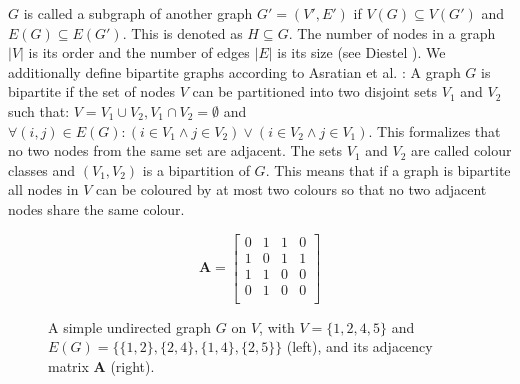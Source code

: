 $G$ is called a subgraph of another graph $G'=(V',E')$ if $V(G) \subseteq V(G')$ and $E(G) \subseteq E(G')$. This is denoted as $H \subseteq G$. The number of nodes in a graph $|V|$ is its order and the number of edges $|E|$ is its size (see Diestel \cite{Diestel2017}).
We additionally define bipartite graphs according to Asratian et al. \cite{asratian1998}: A graph $G$ is bipartite if the set of nodes $V$ can be partitioned into two disjoint sets $V_1$ and $V_2$ such that: $V = V_1 \cup V_2, V_1 \cap V_2 = \emptyset$ and $\forall (i,j) \in E(G): (i \in V_1 \land j \in V_2) \lor (i \in V_2 \land j \in V_1)$. This formalizes that no two nodes from the same set are adjacent. The sets $V_1$ and $V_2$ are called colour classes and $(V_1, V_2)$ is a bipartition of $G$. This means that if a graph is bipartite all nodes in $V$ can be coloured by at most two colours so that no two adjacent nodes share the same colour.\\
\begin{figure}[h]
    \centering
    \begin{minipage}{0.5\textwidth}
        \centering
    \end{minipage}%
    \begin{minipage}{0.45\textwidth}
        \vspace*{0.1cm} %
        \[
        \mathbf{A} = \begin{bmatrix}
            0 & 1 & 1 & 0 \\
            1 & 0 & 1 & 1 \\
            1 & 1 & 0 & 0 \\
            0 & 1 & 0 & 0 \\
        \end{bmatrix}
        \]
    \end{minipage}
    \caption[Example of an undirected graph]{A simple undirected graph $G$ on $V$, with $V=\{1,2,4,5\}$ and $E(G)=\{\{1,2\},\{2,4\},\{1,4\},\{2,5\}\}$ (left), and its adjacency matrix $\mathbf{A}$ (right).}
    \label{fig:graph-example}
\end{figure}


